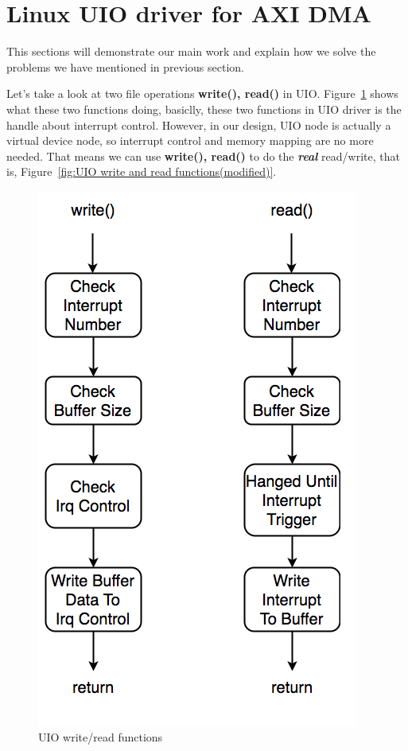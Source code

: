 \section{Linux UIO driver for AXI DMA}
\label{sec:Linux UIO driver for AXI DMA}
This sections will demonstrate our main work and explain how we solve the problems we have mentioned in previous section.

Let's take a look at two file operations \textbf{write(), read()} in UIO. Figure~\ref{fig:UIO write and read functions.} shows what these two functions doing, basiclly, these two functions in UIO driver is the handle about interrupt control. However, in our design, UIO node is actually a virtual device node, so interrupt control and memory mapping are no more needed. That means we can use \textbf{write(), read()} to do the \emph{\textbf{real}} read/write, that is, Figure~\ref{fig:UIO write and read functions(modified)}. 

\begin{figure}[!htb]
  \centering
  \includegraphics[scale=0.5]{images/uio_func_write.png}
  \caption[UIO write/read functions.]{UIO write/read functions}
  \label{fig:UIO write and read functions.}
\end{figure}

